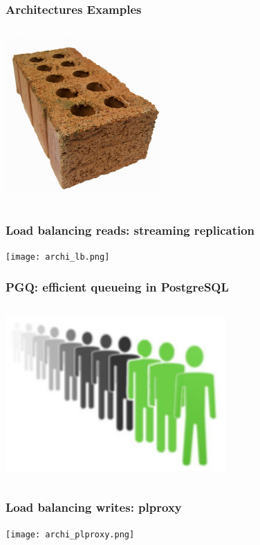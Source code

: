 \documentclass{beamer}
\begin{document}
\begin{frame}
  \frametitle{Architectures Examples}

\begin{columns}[c]
  \includegraphics[height=16em]{brick-large.jpg}
\end{columns}
\end{frame}

\begin{frame}
  \frametitle{Load balancing reads: streaming replication}

  \texttt{[image: archi\_lb.png]}
\end{frame}

\begin{frame}
  \frametitle{PGQ: efficient queueing in PostgreSQL}

\begin{columns}[c]
  \includegraphics[height=16em]{coop-workers.jpeg}
\end{columns}
\end{frame}

\begin{frame}
  \frametitle{Load balancing writes: plproxy}

  \texttt{[image: archi\_plproxy.png]}
\end{frame}
\end{document}
